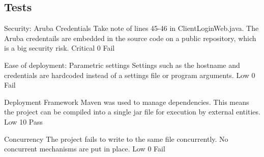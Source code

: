 \subsection{Tests}
\NonFuncReq
{Security: Aruba Credentials}
{Take note of lines 45-46 in ClientLoginWeb.java. The Aruba credentails are embedded in the source code on a public repository, which is a big security risk.}
{Critical}
{0}
{Fail}

{Ease of deployment: Parametric settings}
{Settings such as the hostname and credentials are hardcoded instead of a settings file or program arguments.}
{Low}
{0}
{Fail}

{Deployment Framework}
{Maven was used to manage dependencies. This means the project can be compiled into a single jar file for execution by external entities.}
{Low}
{10}
{Pass}

{Concurrency}
{The project fails to write to the same file concurrently. No  concurrent mechanisms are put in place.}
{Low}
{0}
{Fail}
